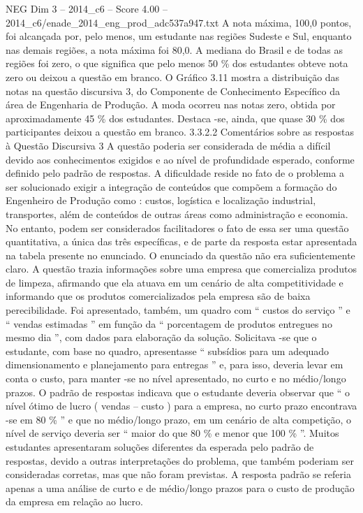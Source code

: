 \begin{textsample}{NEG Dim 3 – 2014\_c6 – Score 4.00 – 2014\_c6/enade\_2014\_eng\_prod\_adc537a947.txt}
A nota máxima, 100,0 pontos, foi alcançada por, pelo menos, um estudante nas regiões Sudeste e Sul, enquanto nas demais regiões, a nota máxima foi 80,0.
A mediana do Brasil e de todas as regiões foi zero, o que significa que pelo menos 50 \% dos estudantes obteve nota zero ou deixou a questão em branco.
O Gráfico 3.11 mostra a distribuição das notas na questão discursiva 3, do Componente de Conhecimento Específico da área de Engenharia de Produção.
A moda ocorreu nas notas zero, obtida por aproximadamente 45 \% dos estudantes.
Destaca -se, ainda, que quase 30 \% dos participantes deixou a questão em branco. 3.3.2.2 Comentários sobre as respostas à Questão Discursiva 3 A questão poderia ser considerada de média a difícil devido aos conhecimentos exigidos e ao nível de profundidade esperado, conforme definido pelo padrão de respostas.
A dificuldade reside no fato de o problema a ser solucionado exigir a integração de conteúdos que compõem a formação do Engenheiro de Produção como : custos, logística e localização industrial, transportes, além de conteúdos de outras áreas como administração e economia.
No entanto, podem ser considerados facilitadores o fato de essa ser uma questão quantitativa, a única das três específicas, e de parte da resposta estar apresentada na tabela presente no enunciado.
O enunciado da questão não era suficientemente claro.
A questão trazia informações sobre uma empresa que comercializa produtos de limpeza, afirmando que ela atuava em um cenário de alta competitividade e informando que os produtos comercializados pela empresa são de baixa perecibilidade.
Foi apresentado, também, um quadro com “ custos do serviço ” e “ vendas estimadas ” em função da “ porcentagem de produtos entregues no mesmo dia ”, com dados para elaboração da solução.
Solicitava -se que o estudante, com base no quadro, apresentasse “ subsídios para um adequado dimensionamento e planejamento para entregas ” e, para isso, deveria levar em conta o custo, para manter -se no nível apresentado, no curto e no médio/longo prazos.
O padrão de respostas indicava que o estudante deveria observar que “ o nível ótimo de lucro ( vendas – custo ) para a empresa, no curto prazo encontrava -se em 80 \% ” e que no médio/longo prazo, em um cenário de alta competição, o nível de serviço deveria ser “ maior do que 80 \% e menor que 100 \% ”.
Muitos estudantes apresentaram soluções diferentes da esperada pelo padrão de respostas, devido a outras interpretações do problema, que também poderiam ser consideradas corretas, mas que não foram previstas.
A resposta padrão se referia apenas a uma análise de curto e de médio/longo prazos para o custo de produção da empresa em relação ao lucro.

\end{textsample}
